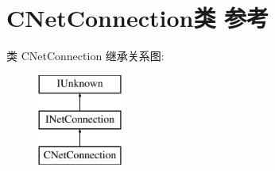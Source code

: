\hypertarget{class_c_net_connection}{}\section{C\+Net\+Connection类 参考}
\label{class_c_net_connection}
类 C\+Net\+Connection 继承关系图\+:\begin{figure}[H]
\begin{center}
\leavevmode
\includegraphics[height=3.000000cm]{class_c_net_connection}
\end{center}
\end{figure}
